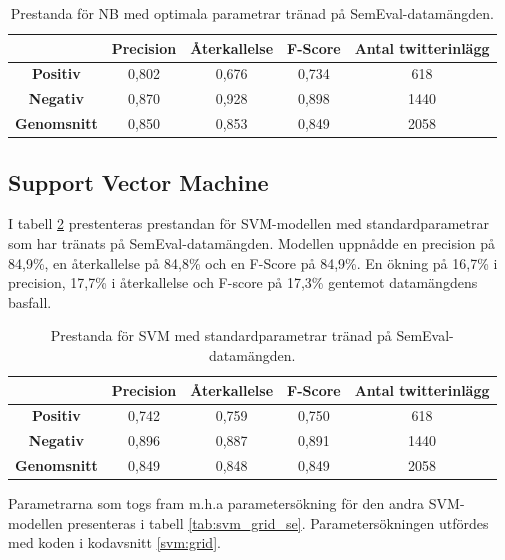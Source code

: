 \documentclass{kaumasters} %
\begin{document}
\begin{table}[H]
\centering
\caption{Prestanda för NB med optimala parametrar tränad på SemEval-datamängden.}
\label{tab:nb_imp_se}
    \begin{tabular}{ccccc}
    \toprule
     & \textbf{Precision} & \textbf{Återkallelse} & \textbf{F-Score} & \textbf{Antal twitterinlägg}  \\
    \midrule
    \textbf{Positiv} & 0,802 & 0,676 & 0,734 & 618 \\
    \textbf{Negativ} & 0,870 & 0,928 & 0,898 & 1440 \\
    \midrule
    \textbf{Genomsnitt} & 0,850 & 0,853 & 0,849  & 2058 \\
    \bottomrule
\end{tabular}
\end{table}

\subsection{Support Vector Machine}
I tabell \ref{tab:svm_base_se} prestenteras prestandan för SVM-modellen med standardparametrar som har tränats på SemEval-datamängden. Modellen uppnådde en precision på 84,9\%, en återkallelse på 84,8\% och en F-Score på 84,9\%. En ökning på 16,7\% i precision, 17,7\% i återkallelse och F-score på 17,3\% gentemot datamängdens basfall.

\begin{table}[H]
\centering
\caption{Prestanda för SVM med standardparametrar tränad på SemEval-datamängden.}
\label{tab:svm_base_se}
    \begin{tabular}{ccccc}
    \toprule
     & \textbf{Precision} & \textbf{Återkallelse} & \textbf{F-Score} & \textbf{Antal twitterinlägg}  \\
    \midrule
    \textbf{Positiv} & 0,742 & 0,759 & 0,750 & 618 \\
    \textbf{Negativ} & 0,896 & 0,887 & 0,891 & 1440 \\
    \midrule
    \textbf{Genomsnitt} & 0,849 & 0,848 & 0,849  & 2058 \\
    \bottomrule
\end{tabular}
\end{table}

Parametrarna som togs fram m.h.a parametersökning för den andra SVM-modellen presenteras i tabell \ref{tab:svm_grid_se}. Parametersökningen utfördes med koden i kodavsnitt \ref{svm:grid}. 
\end{document}
